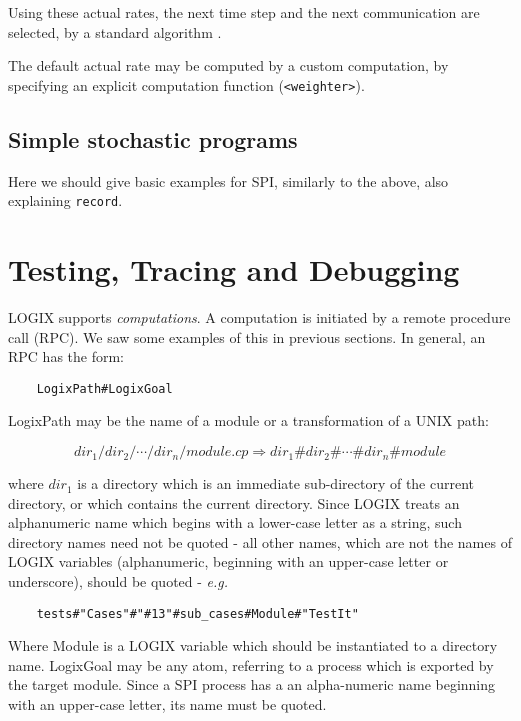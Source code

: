 Using these actual rates, the next time step and the next
communication are selected, by a standard algorithm \cite{Gil77}.

The default actual rate may be computed by a custom computation,
by specifying an explicit computation function (\verb+<weighter>+).

\section{Simple stochastic programs}

Here we should give basic examples for SPI, similarly to
the above, also explaining \verb+record+.


\chapter{Testing, Tracing and Debugging}
\label{debug}

LOGIX supports {\em computations}.  A computation is initiated by
a remote procedure call (RPC).  We saw some examples of this in
previous sections.  In general, an RPC has the form:

\begin{verbatim}
    LogixPath#LogixGoal
\end{verbatim}

\noindent
LogixPath may be the name of a module or a transformation of a UNIX path:

\[dir_{1}/dir_{2}/ \cdots /dir_{n}/module.cp  \Rightarrow  dir_{1}\#dir_{2}\# \cdots \#dir_{n}\#module\]

\noindent
where $dir_{1}$ is a directory which is an immediate sub-directory
of the current directory, or which contains the current directory.
Since LOGIX treats an alphanumeric name which begins with a lower-case
letter as a string, such directory names need not be quoted - all
other names, which are not the names of LOGIX variables (alphanumeric,
beginning with an upper-case letter or underscore), should be quoted -
{\em e.g.}

\begin{verbatim}
    tests#"Cases"#"#13"#sub_cases#Module#"TestIt"
\end{verbatim}

Where Module is a LOGIX variable which should be instantiated to a
directory name.
\noindent
LogixGoal may be any atom, referring to a process which is exported by
the target module.  Since a SPI process has a an alpha-numeric name
beginning with an upper-case letter, its name must be quoted.

